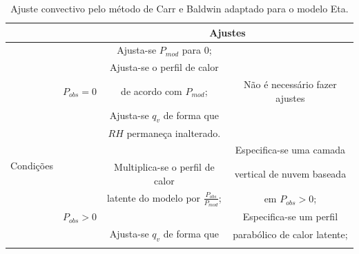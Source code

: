 \begin{table}[!h]
\caption{Ajuste convectivo pelo método de Carr e Baldwin adaptado para o \-mo\-de\-lo Eta.}
\label{tab03}
\centering
\begin{tabular}{|c|c|c|c|}
\cline{3-4} 
\multicolumn{1}{c}{} &  & \multicolumn{2}{c|}{Ajustes}\tabularnewline
\hline 
\begin{sideways}

\end{sideways} &  & Ajusta-se $P_{mod}$ para 0; & \tabularnewline
\begin{sideways}

\end{sideways} &  & Ajusta-se o perfil de calor & \tabularnewline
\begin{sideways}

\end{sideways} & $P_{obs}=0$ & de acordo com $P_{mod}$; & Não é necessário fazer ajustes\tabularnewline
\begin{sideways}

\end{sideways} &  & Ajusta-se $q_{v}$ de forma que & \tabularnewline
\begin{sideways}

\end{sideways} &  & $RH$ permaneça inalterado. & \tabularnewline
\cline{2-4} 
\multirow{2}{0pt}{\begin{sideways}Condições\end{sideways}}
\begin{sideways}

\end{sideways} &  &  & Especifica-se uma camada\tabularnewline
 
\begin{sideways}

\end{sideways} &  & Multiplica-se o perfil de calor & vertical de nuvem baseada\tabularnewline
\begin{sideways}

\end{sideways} &  & latente do modelo por $\frac{P_{obs}}{P_{mod}}$; & em $P_{obs}>0$;\tabularnewline
\begin{sideways}

\end{sideways} & $P_{obs}>0$&  & Especifica-se um perfil\tabularnewline
\begin{sideways}

\end{sideways} &  & Ajusta-se $q_{v}$ de forma que & parabólico de calor latente;\tabularnewline
\begin{sideways}


\end{sideways}
\end{tabular}
\end{table}
